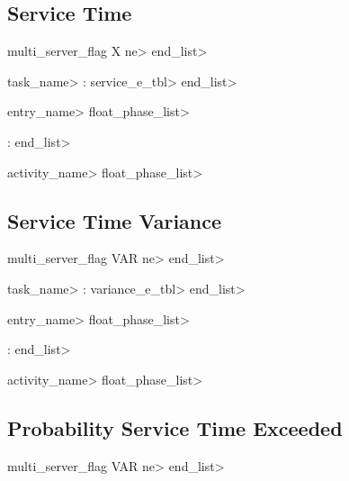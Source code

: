 \subsection{Service Time}
\label{sec:service-time-p}

\begin{bnf}{multi\_server\_flag}
   X \<ne>  \<end\_list>

   \<task\_name> : \<service\_e\_tbl> \<end\_list> 

   

   \<entry\_name> \<float\_phase\_list>

   :  \<end\_list>

   \<activity\_name> \<float\_phase\_list>
\end{bnf}

\subsection{Service Time Variance}
\label{sec:service-time-variance-p}

\begin{bnf}{multi\_server\_flag}
   VAR \<ne> 
  \<end\_list>

   \<task\_name> : \<variance\_e\_tbl> \<end\_list> 

   

   \<entry\_name> \<float\_phase\_list>

   :  \<end\_list>

   \<activity\_name> \<float\_phase\_list>
\end{bnf}

\subsection{Probability Service Time Exceeded}
\label{sec:service-time-exceeded-p}

\begin{bnf}{multi\_server\_flag}
   VAR \<ne> 
  \<end\_list>

\end{bnf}


